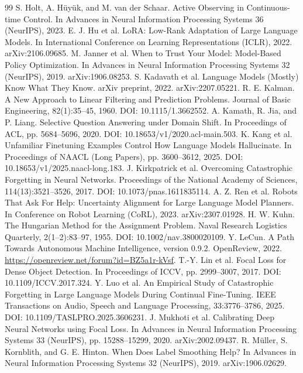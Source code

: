 \documentclass[11pt]{article}
\begin{document}
\begin{thebibliography}{99}
 S. Holt, A. H\"{u}y\"{u}k, and M. van der Schaar. Active Observing in Continuous-time Control. In Advances in Neural Information Processing Systems 36 (NeurIPS), 2023.
 E. J. Hu et al. LoRA: Low-Rank Adaptation of Large Language Models. In International Conference on Learning Representations (ICLR), 2022. arXiv:2106.09685.
 M. Janner et al. When to Trust Your Model: Model-Based Policy Optimization. In Advances in Neural Information Processing Systems 32 (NeurIPS), 2019. arXiv:1906.08253.
 S. Kadavath et al. Language Models (Mostly) Know What They Know. arXiv preprint, 2022. arXiv:2207.05221.
 R. E. Kalman. A New Approach to Linear Filtering and Prediction Problems. Journal of Basic Engineering, 82(1):35--45, 1960. DOI: 10.1115/1.3662552.
 A. Kamath, R. Jia, and P. Liang. Selective Question Answering under Domain Shift. In Proceedings of ACL, pp. 5684--5696, 2020. DOI: 10.18653/v1/2020.acl-main.503.
 K. Kang et al. Unfamiliar Finetuning Examples Control How Language Models Hallucinate. In Proceedings of NAACL (Long Papers), pp. 3600--3612, 2025. DOI: 10.18653/v1/2025.naacl-long.183.
 J. Kirkpatrick et al. Overcoming Catastrophic Forgetting in Neural Networks. Proceedings of the National Academy of Sciences, 114(13):3521--3526, 2017. DOI: 10.1073/pnas.1611835114.
 A. Z. Ren et al. Robots That Ask For Help: Uncertainty Alignment for Large Language Model Planners. In Conference on Robot Learning (CoRL), 2023. arXiv:2307.01928.
 H. W. Kuhn. The Hungarian Method for the Assignment Problem. Naval Research Logistics Quarterly, 2(1--2):83--97, 1955. DOI: 10.1002/nav.3800020109.
 Y. LeCun. A Path Towards Autonomous Machine Intelligence, version 0.9.2. OpenReview, 2022. \url{https://openreview.net/forum?id=BZ5a1r-kVsf}.
 T.-Y. Lin et al. Focal Loss for Dense Object Detection. In Proceedings of ICCV, pp. 2999--3007, 2017. DOI: 10.1109/ICCV.2017.324.
 Y. Luo et al. An Empirical Study of Catastrophic Forgetting in Large Language Models During Continual Fine-Tuning. IEEE Transactions on Audio, Speech and Language Processing, 33:3776--3786, 2025. DOI: 10.1109/TASLPRO.2025.3606231.
 J. Mukhoti et al. Calibrating Deep Neural Networks using Focal Loss. In Advances in Neural Information Processing Systems 33 (NeurIPS), pp. 15288--15299, 2020. arXiv:2002.09437.
 R. M\"{u}ller, S. Kornblith, and G. E. Hinton. When Does Label Smoothing Help? In Advances in Neural Information Processing Systems 32 (NeurIPS), 2019. arXiv:1906.02629.

\end{thebibliography}
\end{document}
